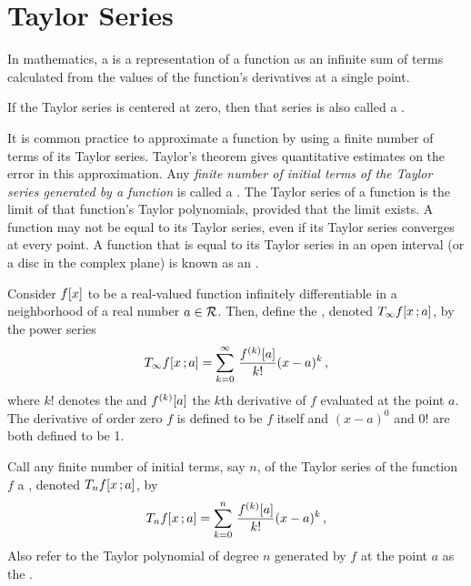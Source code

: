 \section{Taylor Series}
In mathematics, a  is a representation of a function as an infinite sum of terms calculated from the values of the function's derivatives at a single point.

If the Taylor series is centered at zero, then that series is also called a .

It is common practice to approximate a function by using a finite number of terms of its Taylor series. Taylor's theorem gives quantitative estimates on the error in this approximation. Any \emph{finite number of initial terms of the Taylor series generated by a function} is called a . The Taylor series of a function is the limit of that function's Taylor polynomials, provided that the limit exists. A function may not be equal to its Taylor series, even if its Taylor series converges at every point. A function that is equal to its Taylor series in an open interval (or a disc in the complex plane) is known as an .

\begin{definition}
Consider $f\!\left[{x}\right]$ to be a real-valued function infinitely differentiable in a neighborhood of a real number $a\in\mathcal{R}$. Then, define the , denoted $T_{\infty}{f}\!\left[{{x}\,;{a}}\right]$, by the power series
%
\begin{equation}\label{eq:deftaylorseries}
T_{\infty}{f}\!\left[{{x}\,;{a}}\right] = \sum_{k = 0}^{\infty}\,\dfrac{f^{(k)}\!\left[{a}\right]}{k!}(x - a)^k\,,
\end{equation}
%
where $k!$ denotes the  and $f^{(k)}\!\left[{a}\right]$ the $k$th derivative of $f$ evaluated at the point $a$. The derivative of order zero $f$ is defined to be $f$ itself and $(x - a)^0$ and $0!$ are both defined to be 1.
\end{definition}

Call any finite number of initial terms, say $n$, of the Taylor series of the function $f$ a , denoted $T_{n}{f}\!\left[{{x}\,;{a}}\right]$, by
\begin{equation}\label{eq:deftaylorpoly}
T_{n}{f}\!\left[{{x}\,;{a}}\right] = \sum_{k = 0}^{n}\,\dfrac{f^{(k)}\!\left[{a}\right]}{k!}(x - a)^k\,,
\end{equation}
Also refer to the Taylor polynomial of degree $n$ generated by $f$ at the point $a$ as the .

